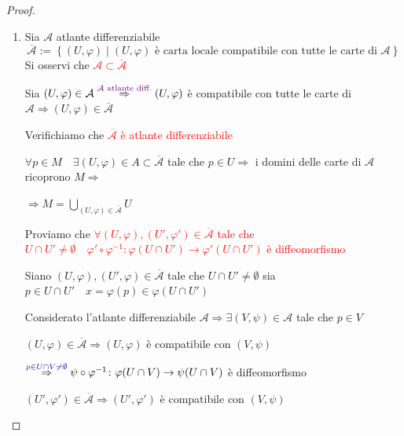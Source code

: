         \begin{proof}
        \mbox{}

        \begin{enumerate}
            \item Sia $\mathcal{A}$ atlante differenziabile 
            \[ \overline{\mathcal{A}} := \left\{ (U, \varphi) \mid (U, \varphi) \text{ è carta locale compatibile con tutte le carte di } \mathcal{A} \right\} \]
            Si osservi che \textcolor{red}{$\mathcal{A} \subset \overline{\mathcal{A}}$}

            Sia $(U, \varphi) \in \mathcal{A} \overset{\textcolor{violet}{\mathcal{A} \text{ atlante diff.}}}{\Rightarrow} (U, \varphi)$ è compatibile con tutte le carte di $\mathcal{A} \Rightarrow (U, \varphi) \in \overline{\mathcal{A}}$

            Verifichiamo che \textcolor{red}{$\overline{\mathcal{A}}$ è atlante differenziabile}

            $\forall p \in M \quad \exists (U, \varphi) \in A \subset \overline{\mathcal{A}}$ tale che $p \in U \Rightarrow$ i domini delle carte
            di $\mathcal{A}$ ricoprono $M \Rightarrow$
            
            $\displaystyle \Rightarrow M=\bigcup_{(U, \varphi) \in \overline{\mathcal{A}}} U$  

            Proviamo che \textcolor{red}{$\forall (U, \varphi), (U',\varphi') \in \overline{\mathcal{A}}$ tale che $U \cap U' \neq \emptyset \quad \varphi' \circ \varphi^{-1} \colon \varphi(U \cap U') \to \varphi'(U \cap U')$} 
            \textcolor{red}{è diffeomorfismo}
            
            Siano $(U , \varphi), (U' , \varphi) \in \overline{\mathcal{A}}$ tale che $U \cap U' \neq \emptyset$ sia $p \in U \cap U' \quad x = \varphi(p) \in \varphi(U \cap U')$

            Considerato l'atlante differenziabile $\mathcal{A} \Rightarrow \exists (V, \psi) \in \mathcal{A}$ tale che $p \in V$  

            $(U, \varphi) \in \overline{\mathcal{A}} \Rightarrow (U, \varphi)$ è compatibile con $(V, \psi)$

            $\overset{\textcolor{blu}{p \in U \cap V \neq \emptyset}}{\Rightarrow} \psi \circ \varphi^{-1} \colon \varphi(U \cap V) \to \psi (U \cap V)$ è diffeomorfismo

            $(U', \varphi') \in \overline{\mathcal{A}} \Rightarrow (U', \varphi')$ è compatibile con $(V, \psi)$


\end{enumerate}
\end{proof}
